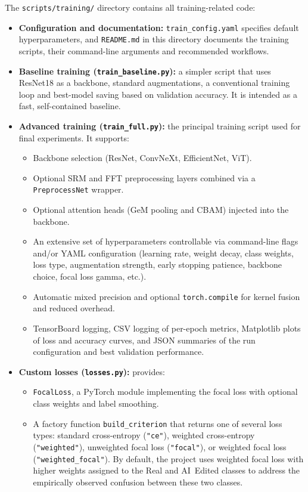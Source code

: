 The \texttt{scripts/training/} directory contains all training-related code:
\begin{itemize}
  \item \textbf{Configuration and documentation:} \texttt{train\_config.yaml} specifies default hyperparameters, and \texttt{README.md} in this directory documents the training scripts, their command-line arguments and recommended workflows.
  \item \textbf{Baseline training (\texttt{train\_baseline.py}):} a simpler script that uses ResNet18 as a backbone, standard augmentations, a conventional training loop and best-model saving based on validation accuracy. It is intended as a fast, self-contained baseline.
  \item \textbf{Advanced training (\texttt{train\_full.py}):} the principal training script used for final experiments. It supports:
  \begin{itemize}
    \item Backbone selection (ResNet, ConvNeXt, EfficientNet, ViT).
    \item Optional SRM and FFT preprocessing layers combined via a \texttt{PreprocessNet} wrapper.
    \item Optional attention heads (GeM pooling and CBAM) injected into the backbone.
    \item An extensive set of hyperparameters controllable via command-line flags and/or YAML configuration (learning rate, weight decay, class weights, loss type, augmentation strength, early stopping patience, backbone choice, focal loss gamma, etc.).
    \item Automatic mixed precision and optional \texttt{torch.compile} for kernel fusion and reduced overhead.
    \item TensorBoard logging, CSV logging of per-epoch metrics, Matplotlib plots of loss and accuracy curves, and JSON summaries of the run configuration and best validation performance.
  \end{itemize}
  \item \textbf{Custom losses (\texttt{losses.py}):} provides:
  \begin{itemize}
    \item \texttt{FocalLoss}, a PyTorch module implementing the focal loss with optional class weights and label smoothing.
    \item A factory function \texttt{build\_criterion} that returns one of several loss types: standard cross-entropy (\texttt{"ce"}), weighted cross-entropy (\texttt{"weighted"}), unweighted focal loss (\texttt{"focal"}), or weighted focal loss (\texttt{"weighted\_focal"}). By default, the project uses weighted focal loss with higher weights assigned to the Real and AI~Edited classes to address the empirically observed confusion between these two classes.
  \end{itemize}
\end{itemize}

